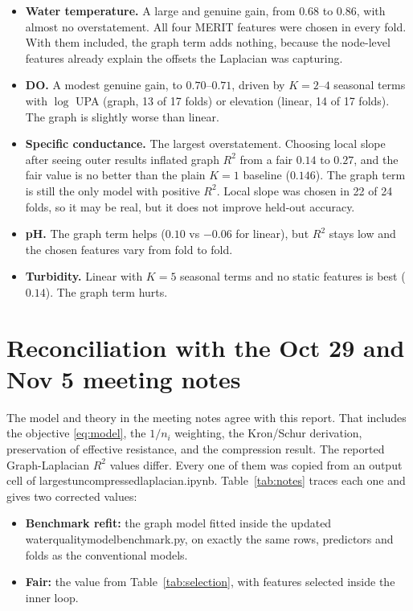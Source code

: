 \documentclass[11pt]{article}
\newcommand{\codeus}{\textunderscore\allowbreak}
\newcommand{\code}[1]{{\ttfamily\let\_\codeus #1}}
\begin{document}
\begin{itemize}
  \item \textbf{Water temperature.} A large and genuine gain, from $0.68$ to $0.86$, with almost
        no overstatement. All four MERIT features were chosen in every fold. With them included,
        the graph term adds nothing, because the node-level features already explain the offsets
        the Laplacian was capturing.
  \item \textbf{DO.} A modest genuine gain, to $0.70$--$0.71$, driven by $K=2$--$4$ seasonal terms
        with $\log$ UPA (graph, 13 of 17 folds) or elevation (linear, 14 of 17 folds).
        The graph is slightly worse than linear.
  \item \textbf{Specific conductance.} The largest overstatement. Choosing local slope after seeing
        outer results inflated graph $R^2$ from a fair $0.14$ to $0.27$, and the fair value is no
        better than the plain $K=1$ baseline ($0.146$). The graph term is still the only model with
        positive $R^2$. Local slope was chosen in 22 of 24 folds, so it may be real, but it does
        not improve held-out accuracy.
  \item \textbf{pH.} The graph term helps ($0.10$ vs $-0.06$ for linear), but $R^2$ stays low and
        the chosen features vary from fold to fold.
  \item \textbf{Turbidity.} Linear with $K=5$ seasonal terms and no static features is best
        ($0.14$). The graph term hurts.
\end{itemize}

\section{Reconciliation with the Oct 29 and Nov 5 meeting notes}

The model and theory in the meeting notes agree with this report. That includes the objective
\eqref{eq:model}, the $1/n_i$ weighting, the Kron/Schur derivation, preservation of effective
resistance, and the compression result. The reported Graph-Laplacian $R^2$ values differ. Every one of
them was copied from an output cell of \code{largest\_uncompressed\_laplacian.ipynb}.
Table~\ref{tab:notes} traces each one and gives two corrected values:
\begin{itemize}
  \item \textbf{Benchmark refit:} the graph model fitted inside the updated
        \code{water\_quality\_model\_benchmark.py}, on exactly the same rows, predictors and folds as
        the conventional models.
  \item \textbf{Fair:} the value from Table~\ref{tab:selection}, with features selected inside the
        inner loop.
\end{itemize}
\end{document}

